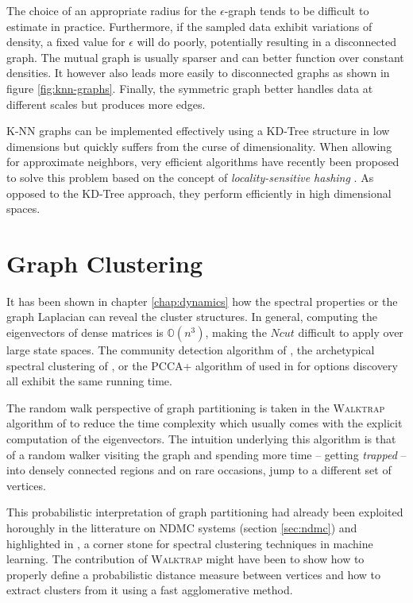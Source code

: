 The choice of an appropriate radius for the $\epsilon$-graph tends to be difficult to estimate in practice. Furthermore, if the sampled data exhibit variations of density, a fixed value for $\epsilon$ will do poorly, potentially resulting in a disconnected graph. The mutual graph is usually sparser and can better function over constant densities. It however also leads more easily to  disconnected graphs as shown in figure \ref{fig:knn-graphs}. Finally, the symmetric graph better handles data at different scales but produces more edges.  

K-NN graphs can be implemented effectively using a KD-Tree \cite{Friedman1977}
structure in low dimensions but quickly suffers from the curse of dimensionality.
When allowing for approximate neighbors, very efficient algorithms have recently
been proposed to solve this problem based on the concept of \textit{locality-sensitive
hashing} \cite{Andoni2008}. As opposed to the KD-Tree approach, they perform
efficiently in high dimensional spaces. 

\section{Graph Clustering}
It has been shown in chapter \ref{chap:dynamics} how the spectral properties or the graph Laplacian can reveal the cluster structures. In general, computing the eigenvectors of dense matrices is $\mathbb{O}(n^3)$, making the $Ncut$ difficult to apply over large state spaces. The community detection algorithm of \cite{Newman2006}, the archetypical spectral clustering of \cite{Ng2001}, or the PCCA+ algorithm of \cite{Deuflhard2005} used in \cite{Mathew2012} for options discovery all exhibit the same running time.

The random walk perspective of graph partitioning is taken in the \textsc{Walktrap} algorithm of \cite{Pons2005} to reduce the time complexity which usually comes with the explicit computation of the eigenvectors. The intuition underlying this algorithm is that of a random walker visiting the graph and spending more time -- getting \textit{trapped} -- into densely connected regions and on rare occasions, jump to a different set of vertices.

This probabilistic interpretation of graph partitioning had already been exploited horoughly in the litterature on NDMC systems (section \ref{sec:ndmc}) and highlighted in \cite{Shi2001}, a corner stone for spectral clustering techniques in machine learning. The contribution of \textsc{Walktrap} might have been to show how to properly define a probabilistic distance measure between vertices and how to extract clusters from it using a fast agglomerative method.

